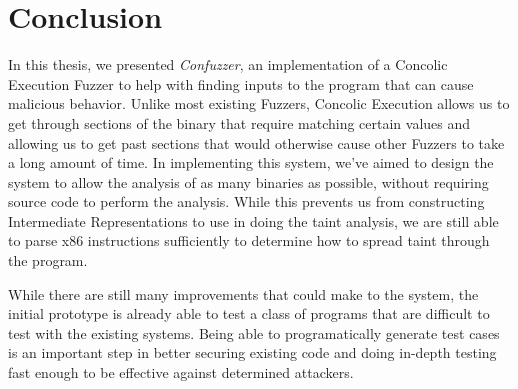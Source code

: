 \chapter{Conclusion}
In this thesis, we presented \textit{Confuzzer}, an implementation of a Concolic
Execution Fuzzer to help with finding inputs to the program that can cause
malicious behavior. Unlike most existing Fuzzers, Concolic Execution allows us
to get through sections of the binary that require matching certain values and
allowing us to get past sections that would otherwise cause other Fuzzers to
take a long amount of time. In implementing this system, we've aimed to design
the system to allow the analysis of as many binaries as possible, without
requiring source code to perform the analysis. While this prevents us from
constructing Intermediate Representations to use in doing the taint analysis, we
are still able to parse x86 instructions sufficiently to determine how to spread
taint through the program.

While there are still many improvements that could make to the system, the
initial prototype is already able to test a class of programs that are difficult
to test with the existing systems. Being able to programatically generate test
cases is an important step in better securing existing code and doing in-depth
testing fast enough to be effective against determined attackers.
